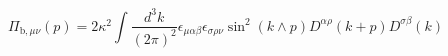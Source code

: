 \begin{equation}
\Pi_{\mbox{b},\mu \nu} (p)=2 \kappa^2 \int \frac{d^3
k}{(2 \pi)^2} \epsilon_{\mu \alpha \beta} \epsilon_{\sigma \rho \nu}
\sin^2(k \wedge p) D^{\alpha \rho} (k+p) D^{\sigma \beta} (k)
\end{equation}

